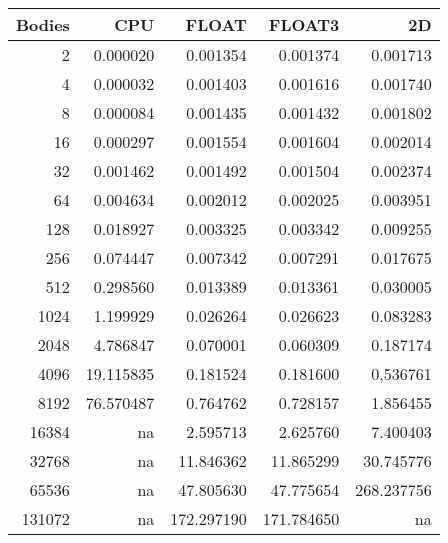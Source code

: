 \documentclass[a4paper]{article}
\begin{document}
\begin{table}[H]
\centering
\footnotesize
\begin{tabular}{|r|r|r|r|r|}
\textbf{Bodies} & \textbf{CPU} & \textbf{FLOAT} & \textbf{FLOAT3} & \textbf{2D} \\ \hline
2      & 0.000020  &   0.001354 &   0.001374 &   0.001713 \\ \hline
4      & 0.000032  &   0.001403 &   0.001616 &   0.001740 \\ \hline
8      & 0.000084  &   0.001435 &   0.001432 &   0.001802 \\ \hline
16     & 0.000297  &   0.001554 &   0.001604 &   0.002014 \\ \hline
32     & 0.001462  &   0.001492 &   0.001504 &   0.002374 \\ \hline
64     & 0.004634  &   0.002012 &   0.002025 &   0.003951 \\ \hline
128    & 0.018927  &   0.003325 &   0.003342 &   0.009255 \\ \hline
256    & 0.074447  &   0.007342 &   0.007291 &   0.017675 \\ \hline
512    & 0.298560  &   0.013389 &   0.013361 &   0.030005 \\ \hline
1024   & 1.199929  &   0.026264 &   0.026623 &   0.083283 \\ \hline
2048   & 4.786847  &   0.070001 &   0.060309 &   0.187174 \\ \hline
4096   & 19.115835 &   0.181524 &   0.181600 &   0,536761 \\ \hline
8192   & 76.570487 &   0.764762 &   0.728157 &   1.856455 \\ \hline
16384  & na        &   2.595713 &   2.625760 &   7.400403 \\ \hline
32768  & na        &  11.846362 &  11.865299 &  30.745776 \\ \hline
65536  & na        &  47.805630 &  47.775654 & 268.237756 \\ \hline
131072 & na        & 172.297190 & 171.784650 & na         \\ \hline
\end{tabular}
\end{table}
\end{document}
